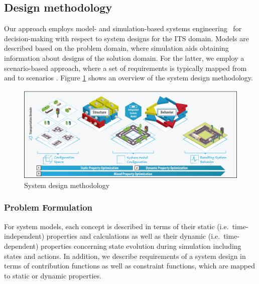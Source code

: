 \documentclass[a4paper,twoside]{article}
\begin{document}
	
		
	\subsection{Design methodology}
	\label{sec:methodology}

	
	Our approach employs model- and simulation-based systems engineering~\cite{gianni2014modeling} for decision-making with respect to system designs for the ITS domain.
	Models are described based on the problem domain, where simulation aids obtaining information about designs of the solution domain. 
	For the latter, we employ a scenario-based approach, where a set of requirements is typically mapped from and to scenarios \cite{sutcliffe_supporting_1998}. Figure \ref{fig:concept} shows an overview of the system design methodology.
	
	\begin{figure}[!ht]
		\centering
		\includegraphics[width=1.0\columnwidth]{property_optimization.png}
		\caption{System design methodology}
		\label{fig:concept}
	\end{figure}
	
	\subsubsection{Problem Formulation}
	For system models, each concept is described in terms of their static (i.e.\ time-independent) properties and calculations as well as their dynamic (i.e.\ time-dependent) properties concerning state evolution during simulation including states and actions. In addition, we describe requirements of a system design in terms of contribution functions as well as constraint functions, which are mapped to static or dynamic properties.
	
\end{document}

